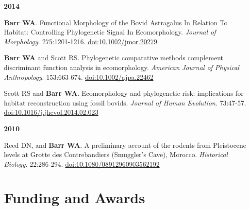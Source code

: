 \documentclass{article}
\begin{document}
\begin{description*}
\item[] {\bfseries 2014}
\item[] {\bfseries Barr WA}. Functional Morphology of the Bovid Astragalus In Relation To Habitat: Controlling Phylogenetic Signal In Ecomorphology. \emph{Journal
of Morphology}. 275:1201-1216. \href{http://dx.doi.org/10.1002/jmor.20279}{doi:10.1002/jmor.20279}

\item[] {\bfseries Barr WA} and Scott RS. Phylogenetic comparative methods complement discriminant function analysis in ecomorphology. \emph{American Journal
of Physical Anthropology}. 153:663-674. \href{http://dx.doi.org/10.1002/ajpa.22462}{doi:10.1002/ajpa.22462}

\item[] Scott RS and {\bfseries Barr WA}. Ecomorphology and phylogenetic risk: implications for habitat reconstruction using fossil bovids.
\emph{Journal of Human Evolution}. 73:47-57. \href{http://dx.doi.org/10.1016/j.jhevol.2014.02.023}{doi:10.1016/j.jhevol.2014.02.023}

\end{description*}

\begin{description*}
\item[] {\bfseries 2010}
\item[] Reed DN, and {\bfseries Barr WA}. A preliminary account of the rodents from Pleistocene levels at Grotte des Contrebandiers (Smuggler's Cave),
Morocco. \emph{Historical Biology}. 22:286-294. \href{http://dx.doi.org/10.1080/08912960903562192}{doi:10.1080/08912960903562192}
\end{description*}


\section*{Funding and Awards}

\end{document}
